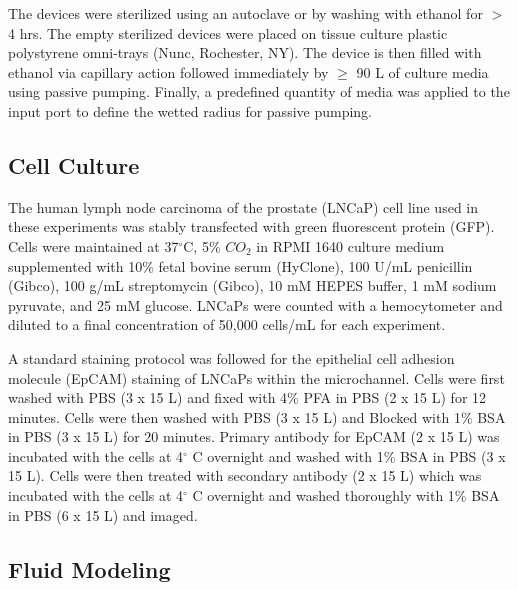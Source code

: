 The devices were sterilized using an autoclave or by washing with ethanol for $>$ 4 hrs. The empty sterilized devices were placed on tissue culture plastic polystyrene omni-trays (Nunc, Rochester, NY). The device is then filled with ethanol via capillary action followed immediately by $\ge$ 90 \textmu L of culture media using passive pumping. Finally, a predefined quantity of media was applied to the input port to define the wetted radius for passive pumping.

\subsection{Cell Culture}

The human lymph node carcinoma of the prostate (LNCaP) cell line used in these experiments was stably transfected with green fluorescent protein (GFP).  Cells were maintained at 37$^{\circ}$C, 5\% $CO_{2}$ in RPMI 1640 culture medium supplemented with 10\% fetal bovine serum (HyClone), 100 U/mL penicillin (Gibco), 100 \textmu g/mL streptomycin (Gibco), 10 mM HEPES buffer, 1 mM sodium pyruvate, and 25 mM glucose.  LNCaPs were counted with a hemocytometer and diluted to a final concentration of 50,000 cells/mL for each experiment.

A standard staining protocol was followed for the epithelial cell adhesion molecule (EpCAM) staining of LNCaPs within the microchannel.  Cells were first washed with PBS (3 x 15 \textmu L) and fixed with 4\% PFA in PBS (2 x 15 \textmu L) for 12 minutes.  Cells were then washed with PBS (3 x 15 \textmu L) and Blocked with 1\% BSA in PBS (3 x 15 \textmu L) for 20 minutes.  Primary antibody for EpCAM (2 x 15 \textmu L) was incubated with the cells at 4$^{\circ}$ C overnight and washed with 1\% BSA in PBS (3 x 15 \textmu L).  Cells were then treated with secondary antibody (2 x 15 \textmu L) which was incubated with the cells at 4$^{\circ}$ C overnight and washed thoroughly with 1\% BSA in PBS (6 x 15 \textmu L) and imaged.

\subsection{Fluid Modeling}

